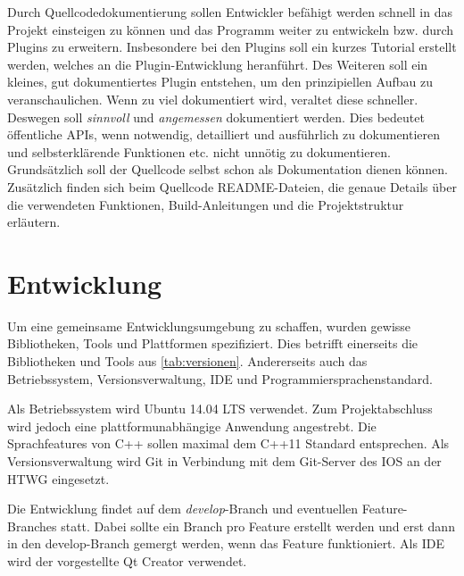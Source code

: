 Durch Quellcodedokumentierung sollen Entwickler befähigt werden schnell in das Projekt einsteigen zu können und das Programm weiter zu entwickeln bzw. durch Plugins zu erweitern.
Insbesondere bei den Plugins soll ein kurzes Tutorial erstellt werden, welches an die Plugin-Entwicklung heranführt. 
Des Weiteren soll ein kleines, gut dokumentiertes Plugin entstehen, um den prinzipiellen Aufbau zu veranschaulichen.
Wenn zu viel dokumentiert wird, veraltet diese schneller.
Deswegen soll \emph{sinnvoll} und \emph{angemessen} dokumentiert werden.
Dies bedeutet öffentliche APIs, wenn notwendig, detailliert und ausführlich zu dokumentieren und selbsterklärende Funktionen etc. nicht unnötig zu dokumentieren.
Grundsätzlich soll der Quellcode selbst schon als Dokumentation dienen können.
Zusätzlich finden sich beim Quellcode README-Dateien, die genaue Details über die verwendeten Funktionen, Build-Anleitungen und die Projektstruktur erläutern.

\section{Entwicklung}

Um eine gemeinsame Entwicklungsumgebung zu schaffen, wurden gewisse Bibliotheken, Tools und Plattformen spezifiziert.
Dies betrifft einerseits die Bibliotheken und Tools aus \autoref{tab:versionen}.
Andererseits auch das Betriebssystem, Versionsverwaltung, IDE und Programmiersprachenstandard.

Als Betriebssystem wird Ubuntu 14.04 LTS verwendet. 
Zum Projektabschluss wird jedoch eine plattformunabhängige Anwendung angestrebt.
Die Sprachfeatures von C++ sollen maximal dem C++11 Standard entsprechen.
Als Versionsverwaltung wird Git in Verbindung mit dem Git-Server des IOS an der HTWG eingesetzt. 

Die Entwicklung findet auf dem \emph{develop}-Branch und eventuellen  Feature-Branches statt.
Dabei sollte ein Branch pro Feature erstellt werden und erst dann in den develop-Branch gemergt werden, wenn das Feature funktioniert.
Als IDE wird der vorgestellte Qt Creator verwendet.


